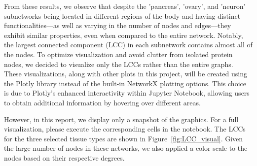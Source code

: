 \documentclass[paper=a4,fontsize=11pt,DIV=8,BCOR=5mm,oneside,pdftex,bibtotocnumbered]{scrreprt}
\theoremstyle{plain}
\begin{document}
	From these results, we observe that despite the 'pancreas', 'ovary', and 'neuron' subnetworks being located in different regions of the body and having distinct functionalities—as well as varying in the number of nodes and edges—they exhibit similar properties, even when compared to the entire network. Notably, the largest connected component (LCC) in each subnetwork contains almost all of the nodes. To optimize visualization and avoid clutter from isolated protein nodes, we decided to visualize only the LCCs rather than the entire graphs. These visualizations, along with other plots in this project, will be created using the Plotly library instead of the built-in NetworkX plotting options. This choice is due to Plotly's enhanced interactivity within Jupyter Notebook, allowing users to obtain additional information by hovering over different areas.
	
	However, in this report, we display only a snapshot of the graphics. For a full visualization, please execute the corresponding cells in the notebook. The LCCs for the three selected tissue types are shown in Figure~\ref{fig:LCC_visual}. Given the large number of nodes in these networks, we also applied a color scale to the nodes based on their respective degrees.
	
\end{document}
